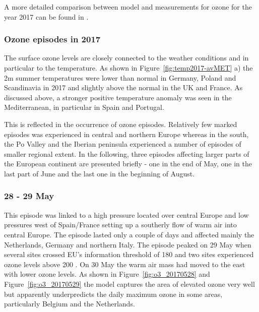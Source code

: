 A more detailed comparison between model and measurements for ozone for the year 2017 can be found in \cite{WEB2019:Eval}.



\subsubsection{Ozone episodes in 2017}
The surface ozone levels are closely connected to the weather conditions and in particular to the temperature. As shown in Figure~\ref{fig:temp2017-avMET} a) the 2m summer temperatures were lower than normal in Germany, Poland and Scandinavia in 2017 and slightly above the normal in the UK and France. As discussed above, a stronger positive temperature anomaly was seen in the Mediterranean, in particular in Spain and Portugal. 

This is reflected in the occurrence of ozone episodes. Relatively few marked episodes was experienced in central and northern Europe whereas in the south, the Po Valley and the Iberian peninsula experienced a number of episodes of smaller regional extent. In the following, three episodes affecting larger parts of the European continent are presented briefly - one in the end of May, one in the last part of June and the last one in the beginning of August. 


\subsubsection{28 - 29 May}
This episode was linked to a high pressure located over central Europe and low pressures west of Spain/France setting up a southerly flow of warm air into central Europe. The episode lasted only a couple of days and affected mainly the Netherlands, Germany and northern Italy. The episode peaked on 29 May when several sites crossed EU's information threshold of 180 \ug and two sites experienced ozone levels above 200 \ug. On 30 May the warm air mass had moved to the east with lower ozone levels. As shown in Figure~\ref{fig:o3_20170528} and Figure~\ref{fig:o3_20170529} the model captures the area of elevated ozone very well but apparently underpredicts the daily maximum ozone in some areas, particularly Belgium and the Netherlands. 
\clearpage



\clearpage
\renewcommand\bibname{References}      %


